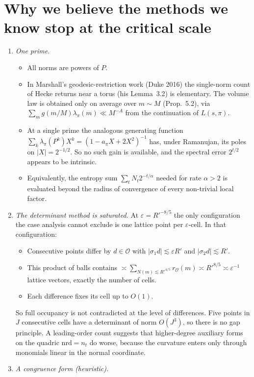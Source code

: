 \documentclass[11pt]{amsart}
\theoremstyle{remark}
\newcommand{\cO}{\mathcal O}
\newcommand{\nrd}{\mathrm{nrd}}
\begin{document}
\section{Why we believe the methods we know stop at the critical scale}
\begin{enumerate}
\item \emph{One prime.}
  \begin{itemize}
  \item All norms are powers of $P$.
  \item In Marshall's geodesic-restriction work (Duke 2016) the single-norm count of Hecke returns near a torus (his Lemma~3.2) is elementary. The volume law is obtained only on average over $m\sim M$ (Prop.~5.2), via $\sum_m g(m/M)\lambda_\pi(m)\ll M^{-A}$ from the continuation of $L(s,\pi)$.
  \item At a single prime the analogous generating function $\sum_k\lambda_\pi(P^k)X^k=(1-a_\pi X+2X^2)^{-1}$ has, under Ramanujan, its poles on $|X|=2^{-1/2}$. So no such gain is available, and the spectral error $2^{t/2}$ appears to be intrinsic.
  \item Equivalently, the entropy sum $\sum_tN_t2^{-t/\alpha}$ needed for rate $\alpha>2$ is evaluated beyond the radius of convergence of every non-trivial local factor.
  \end{itemize}
\item \emph{The determinant method is saturated.} At $\varepsilon=R'^{-8/5}$ the only configuration the case analysis cannot exclude is one lattice point per $\varepsilon$-cell. In that configuration:
  \begin{itemize}
  \item Consecutive points differ by $d\in\cO$ with $|\sigma_1d|\lesssim\varepsilon R'$ and $|\sigma_2d|\lesssim R'$.
  \item This product of balls contains $\asymp\sum_{N(m)\lesssim R'^{4/5}}r_\cO(m)\asymp R'^{8/5}\asymp\varepsilon^{-1}$ lattice vectors, exactly the number of cells.
  \item Each difference fixes its cell up to $O(1)$.
  \end{itemize}
  So full occupancy is not contradicted at the level of differences. Five points in $J$ consecutive cells have a determinant of norm $O(J^3)$, so there is no gap principle. A leading-order count suggests that higher-degree auxiliary forms on the quadric $\nrd=n_t$ do worse, because the curvature enters only through monomials linear in the normal coordinate.
\item \emph{A congruence form (heuristic).}

\end{enumerate}
\end{document}
